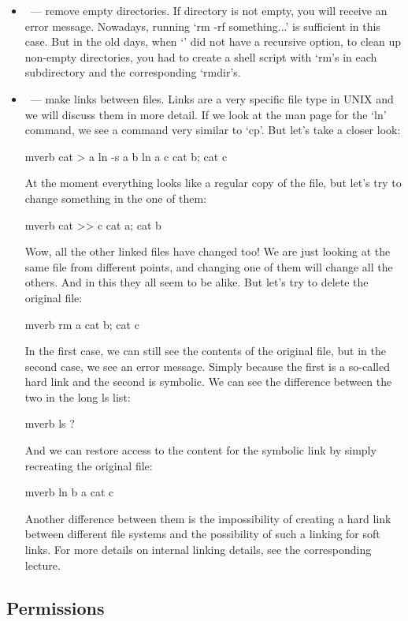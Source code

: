 \begin{itemize}
\item {}~--- remove empty directories. If directory is not empty,
      you will receive an error message. Nowadays, running `rm -rf something...'
      is sufficient in this case. But in the old days, when `' did not have
      a recursive option, to clean up non-empty directories, you had to create
      a shell script with `rm's in each subdirectory and the corresponding
      `rmdir's.
\item {}~--- make links between files. Links are a very specific file
      type in UNIX and we will discuss them in more detail. If we look at
      the man page for the `ln' command, we see a command very similar to `cp'.
      But let's take a closer look:
\begin{code}{mverb}
cat > a
ln -s a b
ln a c
cat b; cat c
\end{code}
At the moment everything looks like a regular copy of the file, but let's
try to change something in the one of them:
\begin{code}{mverb}
cat >> c
cat a; cat b
\end{code}
Wow, all the other linked files have changed too! We are just looking at
the same file from different points, and changing one of them will change
all the others. And in this they all seem to be alike. But let's try
to delete the original file:
\begin{code}{mverb}
rm a
cat b; cat c
\end{code}
In the first case, we can still see the contents of the original file,
but in the second case, we see an error message. Simply because the first
is a so-called hard link and the second is symbolic. We can see the
difference between the two in the long ls list:
\begin{code}{mverb}
ls ?
\end{code}
And we can restore access to the content for the symbolic link by simply
recreating the original file:
\begin{code}{mverb}
ln b a
cat c
\end{code}
Another difference between them is the impossibility of creating a hard link
between different file systems and the possibility of such a linking
for soft links. For more details on internal linking details, see
the corresponding
lecture.
\end{itemize}

\subsection*{Permissions}


